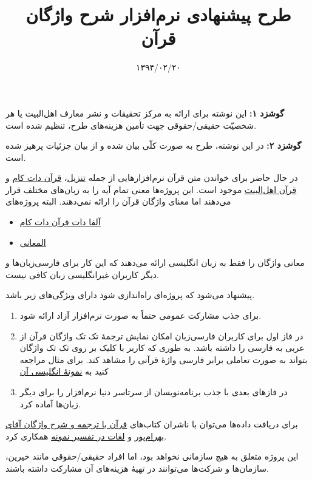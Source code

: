 \documentclass[]{article}
\title{طرح
پیشنهادی نرم‌افزار شرح واژگان قرآن}
\date{۱۳۹۴/۰۲/۲۰}
\begin{document}
\maketitle

\textbf{گوشزد ۱:} این نوشته برای ارائه به مرکز تحقیقات و نشر معارف
اهل‌البیت یا هر شخصیّت حقیقی/حقوقی جهت تأمین هزینه‌های طرح، تنظیم شده
است.

\textbf{گوشزد ۲:} در این نوشته، طرح به صورت کلّی بیان شده و از بیان
جزئیات پرهیز شده است.

در حال حاضر برای خواندن متن قرآن نرم‌افزارهایی از جمله
\href{http://tanzil.net}{تنزیل}، \href{quran.com}{قرآن دات کام} و
\href{http://quran.ahlolbait.com/}{قرآن اهل‌البیت} موجود است. این
پروژه‌ها معنی تمام آیه را به زبا‌ن‌های مختلف قرار می‌دهند اما معنای
واژگان قرآن را ارائه نمی‌دهند. البته پروژه‌های

\begin{itemize}
\itemsep1pt\parskip0pt
\item
  \href{http://alpha.quran.com/}{آلفا دات قرآن دات کام}
\item
  \href{http://www.almaany.com/quran}{المعانی}
\end{itemize}

معانی واژگان را فقط به زبان انگلیسی ارائه می‌دهند که این کار برای
فارسی‌زبان‌ها و دیگر کاربران غیر‌انگلیسی زبان کافی نیست.

پیشنهاد می‌شود که پروژه‌ای راه‌اندازی شود دارای ویژگی‌های زیر باشد.

\begin{enumerate}
\def\labelenumi{\arabic{enumi}.}
\itemsep1pt\parskip0pt
\item
  برای جذب مشارکت عمومی حتماً به صورت نرم‌افزار آزاد ارائه شود.
\item
  در فاز اول برای کاربران فارسی‌زبان امکان نمایش ترجمهٔ تک تک واژگان
  قرآن از عربی به فارسی را داشته باشد. به طوری که کاربر با کلیک بر روی
  تک تک واژگان بتواند به صورت تعاملی برابر فارسی واژهٔ قرآنی را مشاهد
  کند. برای مثال مراجعه کنید به \href{http://alpha.quran.com/}{نمونهٔ
  انگلیسی آن}
\item
  در فازهای بعدی با جذب برنامه‌نویسان از سرتاسر دنیا نرم‌افزار را برای
  دیگر زبان‌ها آماده کرد.
\end{enumerate}

برای دریافت داده‌ها می‌توان با ناشران کتاب‌های
\href{http://bookroom.ir/book/5380}{قرآن با ترجمه و شرح واژگان آقای
بهرام‌پور} و
\href{http://makarem.ir/newmain.aspx?lid=0\&mid=61913\&CatID=6509\&typeinfo=3}{لغات
در تفسیر نمونه} همکاری کرد.

این پروژه متعلق به هیچ سازمانی نخواهد بود، اما افراد حقیقی/حقوقی مانند
خیرین، سازمان‌ها و شرکت‌ها می‌توانند در تهیهٔ هزینه‌های آن مشارکت داشته
باشند.
\end{document}
